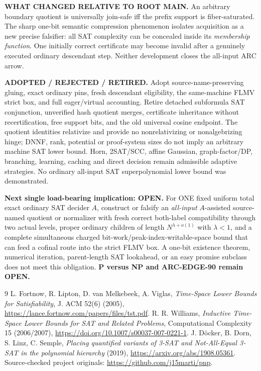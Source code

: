 \documentclass[11pt]{article}
\begin{document}
\textbf{WHAT CHANGED RELATIVE TO ROOT MAIN.}
An arbitrary boundary quotient is universally join-safe iff
the prefix support is fiber-saturated. The sharp one-bit
semantic compression phenomenon isolates acquisition as
a new precise falsifier: all SAT complexity can be concealed
inside its \emph{membership function}. One initially correct
certificate may become invalid after a genuinely executed
ordinary descendant step. Neither development closes the
all-input ARC arrow.

\textbf{ADOPTED / REJECTED / RETIRED.}
Adopt source-name-preserving gluing, exact ordinary pins,
fresh descendant eligibility, the same-machine FLMV strict box,
and full eager/virtual accounting. Retire detached
subformula SAT conjunction, unverified hash quotient
merges, certificate inheritance without recertification,
free support bits, and the old universal cosine endpoint.
The quotient identities relativize and provide no
nonrelativizing or nonalgebrizing hinge; DNNF, rank,
potential or proof-system sizes do not imply an arbitrary
machine SAT lower bound. Horn, 2SAT/SCC, affine Gaussian,
graph-factor/DP, branching, learning, caching and
direct decision remain admissible adaptive strategies.
No ordinary all-input SAT superpolynomial lower bound
was demonstrated.

\textbf{Next single load-bearing implication: OPEN.}
For ONE fixed uniform total exact ordinary SAT decider $A$,
construct or falsify an \emph{all-input} $A$-assisted
source-named quotient or normalizer with fresh correct
both-label compatibility through two actual levels,
proper ordinary children of length $N^{\lambda+o(1)}$
with $\lambda<1$, and a complete simultaneous charged
bit-work/peak-index-writable-space bound that can
feed a cofinal route into the strict FLMV box.
A one-bit existence theorem, numerical iteration,
parent-length SAT lookahead, or an easy promise subclass
does not meet this obligation. \textbf{P versus NP and
ARC-EDGE-90 remain OPEN.}

\begin{thebibliography}{9}
 L. Fortnow, R. Lipton, D. van Melkebeek,
A. Viglas, \emph{Time-Space Lower Bounds for Satisfiability},
J. ACM 52(6) (2005),
\url{https://lance.fortnow.com/papers/files/tst.pdf}.
 R. R. Williams,
\emph{Inductive Time-Space Lower Bounds for SAT and Related
Problems}, Computational Complexity 15 (2006/2007),
\url{https://doi.org/10.1007/s00037-007-0221-1}.
 J. D\"ocker, B. Dorn, S. Linz, C. Semple,
\emph{Placing quantified variants of 3-SAT and
Not-All-Equal 3-SAT in the polynomial hierarchy} (2019),
\url{https://arxiv.org/abs/1908.05361}.
 Source-checked project originals:
\url{https://github.com/j15marti/pnp}.
\end{thebibliography}
\end{document}
